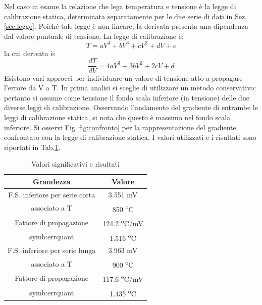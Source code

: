 Nel caso in esame la relazione che lega temperatura e tensione è la legge di calibrazione statica, determinata separatamente per le due serie di dati in Sez.\ref{sec:legge}. Poiché tale legge è non lineare, la derivata presenta una dipendenza dal valore puntuale di tensione. La legge di calibrazione è:
\begin{equation}
	T = aV^4 + bV^3+cV^2+dV+e
\end{equation}
la cui derivata è: 
\begin{equation}
	\frac{dT}{dV} = 4aV^3+3bV^2+2cV+d
\end{equation}
Esistono vari approcci per individuare un valore di tensione atto a propagare l'errore da V a T. In prima analisi si sceglie di utilizzare un metodo conservativo: pertanto si assume come tensione il fondo scala inferiore (in tensione) delle due diverse leggi di calibrazione. Osservando l'andamento del gradiente di entrambe le leggi di calibrazione statica, si nota che questo è massimo nel fondo scala inferiore. Si osservi Fig.\ref{fig:confronto} per la rappresentazione del gradiente confrontato con la legge di calibrazione statica. 
I valori utilizzati e i risultati sono riportati in Tab.\ref{tab:valorierisultati}.
\begin{table}[H]
\centering
\begin{tabular}{c|c}
	\toprule
	\toprule
	\textbf{Grandezza} & \textbf{Valore} \\
	\midrule
	F.S. inferiore per serie corta & 3.551 mV\\
	associato a T & 850 \textsuperscript{o}C\\
	\midrule
	Fattore di propagazione & 124.2 \textsuperscript{o}C/mV\\
	\midrule
	\gls{symb:errquant} & 1.516 \textsuperscript{o}C\\
	\midrule
	\midrule
	F.S. inferiore per serie lunga & 3.963 mV\\
	associato a T & 900 \textsuperscript{o}C\\
	\midrule
	Fattore di propagazione & 117.6 \textsuperscript{o}C/mV\\
	\midrule
	\gls{symb:errquant} & 1.435 \textsuperscript{o}C\\
	
	\bottomrule
	\bottomrule
\end{tabular}
\caption{Valori significativi e risultati}
\label{tab:valorierisultati}
\end{table}

